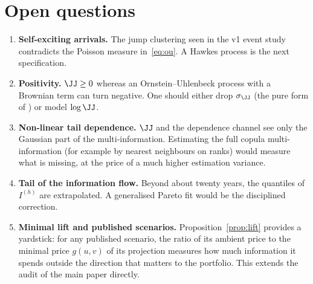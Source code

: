 \section{Open questions}
\label{sec:open}

\begin{enumerate}
\item \textbf{Self-exciting arrivals.} The jump clustering seen in the v1 event
study contradicts the Poisson measure in~\eqref{eq:ou}. A Hawkes process is the
next specification.
\item \textbf{Positivity.} $\JJ\ge0$ whereas an Ornstein--Uhlenbeck process with
a Brownian term can turn negative. One should either drop $\sigma_\JJ$ (the
pure form of \citealt{bns2001}) or model $\log\JJ$.
\item \textbf{Non-linear tail dependence.} $\JJ$ and the dependence channel see
only the Gaussian part of the multi-information. Estimating the full copula
multi-information (for example by nearest neighbours on ranks) would measure
what is missing, at the price of a much higher estimation variance.
\item \textbf{Tail of the information flow.} Beyond about twenty years, the
quantiles of $I^{(h)}$ are extrapolated. A generalised Pareto fit would be the
disciplined correction.
\item \textbf{Minimal lift and published scenarios.}
Proposition~\ref{prop:lift} provides a yardstick: for any published scenario,
the ratio of its ambient price to the minimal price $g(u,v)$ of its projection
measures how much information it spends outside the direction that matters to
the portfolio. This extends the audit of the main paper directly.
\end{enumerate}

